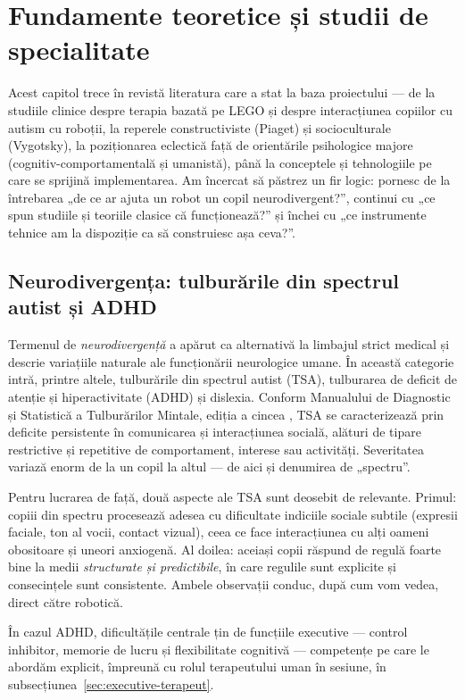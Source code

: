 \chapter{Fundamente teoretice și studii de specialitate}
\label{an:cap:preliminarii}

Acest capitol trece în revistă literatura care a stat la baza proiectului — de la studiile clinice despre terapia bazată pe LEGO și despre interacțiunea copiilor cu autism cu roboții, la reperele constructiviste (Piaget) și socioculturale (Vygotsky), la poziționarea eclectică față de orientările psihologice majore (cognitiv-comportamentală și umanistă), până la conceptele și tehnologiile pe care se sprijină implementarea. Am încercat să păstrez un fir logic: pornesc de la întrebarea „de ce ar ajuta un robot un copil neurodivergent?”, continui cu „ce spun studiile și teoriile clasice că funcționează?” și închei cu „ce instrumente tehnice am la dispoziție ca să construiesc așa ceva?”.

\section{Neurodivergența: tulburările din spectrul autist și ADHD}

Termenul de \emph{neurodivergență} a apărut ca alternativă la limbajul strict medical și descrie variațiile naturale ale funcționării neurologice umane. În această categorie intră, printre altele, tulburările din spectrul autist (TSA), tulburarea de deficit de atenție și hiperactivitate (ADHD) și dislexia. Conform Manualului de Diagnostic și Statistică a Tulburărilor Mintale, ediția a cincea \cite{apa2013}, TSA se caracterizează prin deficite persistente în comunicarea și interacțiunea socială, alături de tipare restrictive și repetitive de comportament, interese sau activități. Severitatea variază enorm de la un copil la altul — de aici și denumirea de „spectru”.

Pentru lucrarea de față, două aspecte ale TSA sunt deosebit de relevante. Primul: copiii din spectru procesează adesea cu dificultate indiciile sociale subtile (expresii faciale, ton al vocii, contact vizual), ceea ce face interacțiunea cu alți oameni obositoare și uneori anxiogenă. Al doilea: aceiași copii răspund de regulă foarte bine la medii \emph{structurate și predictibile}, în care regulile sunt explicite și consecințele sunt consistente. Ambele observații conduc, după cum vom vedea, direct către robotică.

În cazul ADHD, dificultățile centrale țin de funcțiile executive — control inhibitor, memorie de lucru și flexibilitate cognitivă \cite{diamond2013} — competențe pe care le abordăm explicit, împreună cu rolul terapeutului uman în sesiune, în subsecțiunea~\ref{sec:executive-terapeut}.

